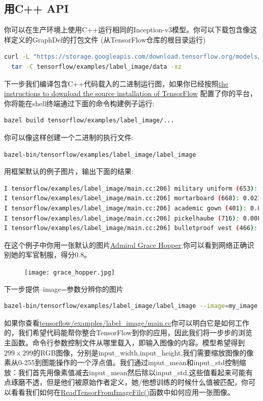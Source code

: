 \subsection{用C++ API}
你可以在生产环境上使用C++运行相同的Inception-v3模型。你可以下载包含像这样定义的GraphDef的打包文件
(从TensorFlow仓库的根目录运行)
\begin{lstlisting}[language=Bash]
curl -L "https://storage.googleapis.com/download.tensorflow.org/models/inception_v3_2016_08_28_frozen.pb.tar.gz" |
  tar -C tensorflow/examples/label_image/data -xz
\end{lstlisting}
下一步我们编译包含C++代码载入的二进制运行图，如果你已经按照\href{https://www.tensorflow.org/install/install_sources}{the instructions to download the source installation of TensorFlow}
配置了你的平台，你将能在shell终端通过下面的命令构建例子运行:
\begin{lstlisting}[language=Bash]
bazel build tensorflow/examples/label_image/...
\end{lstlisting}
你可以像这样创建一个二进制的执行文件:
\begin{lstlisting}[language=Bash]
bazel-bin/tensorflow/examples/label_image/label_image
\end{lstlisting}
用框架默认的例子图片，输出下面的结果:
\begin{lstlisting}[language=Bash]
I tensorflow/examples/label_image/main.cc:206] military uniform (653): 0.834306
I tensorflow/examples/label_image/main.cc:206] mortarboard (668): 0.0218692
I tensorflow/examples/label_image/main.cc:206] academic gown (401): 0.0103579
I tensorflow/examples/label_image/main.cc:206] pickelhaube (716): 0.00800814
I tensorflow/examples/label_image/main.cc:206] bulletproof vest (466): 0.00535088
\end{lstlisting}
在这个例子中你用一张默认的图片\href{https://en.wikipedia.org/wiki/Grace_Hopper}{Admiral Grace Hopper},你可以看到网络正确识别她的军官制服，得分0.8。
\begin{center}
\begin{figure}[H]
\texttt{[image: grace\_hopper.jpg]}
\end{figure}
\end{center}
下一步提供--image=参数分辨你的图片
\begin{lstlisting}[language=Bash]
bazel-bin/tensorflow/examples/label_image/label_image --image=my_image.png
\end{lstlisting}
如果你查看\href{https://github.com/tensorflow/tensorflow/blob/master/tensorflow/examples/label_image/main.cc}{tensorflow/examples/label\_image/main.cc}你可以明白它是如何工作的，我们希望代码能帮你整合TensorFlow到你的应用，因此我们将一步步的浏览主函数。命令行参数控制文件从哪里载入，即输入图像的内容。模型希望得到$299\times299$的RGB图像，分别是input\_width,input\_height,我们需要缩放图像的像素从0-255到图能操作的一个浮点值。我们通过input\_mean和input\_std控制缩放：我们首先用像素值减去input\_mean然后除以input\_std,这些值看起来可能有点琢磨不透，但是他们被原始作者定义，她/他想训练的时候什么值被匹配，你可以看看我们如何在\href{https://github.com/tensorflow/tensorflow/blob/master/tensorflow/examples/label_image/main.cc#L88}{ReadTensorFromImageFile()}函数中如何应用一张图像。
